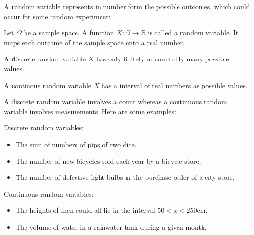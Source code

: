\documentclass[twoside,11pt,a4paper]{article}
\newif\ifEN \ENtrue	                %
\def\tr|#1|#2|{\ifEN #2\else #1\fi}     %
\newenvironment{ttile}[1]{\begin{tcolorbox}[colback=tile,sharp corners,title=#1]}{\end{tcolorbox}}
\def\vsp{\vspace{5mm}}
\theoremstyle{definition}
\begin{document}
\tr|Eine \textbf{Zufallsvariable} bildet die Ergebnisse eines Zufallsexperiments auf eine Zahl ab:
   |A \textbf{random variable} represents in number form the possible outcomes, which could occur for some random experiment:|
\vsp

\begin{ttile}{\tr|Zufallsvariable|Random variable|}
  \tr|Sei $\Omega$ eine Ergebnismenge. Eine Funktion $X: \Omega \to \mathbb{R}$ heisst eine
      \textbf{Zufallsvariable}. Sie bildet jedes Ergebnis auf eine auf eine reelle Zahl ab. 
     |Let $\Omega$ be a sample space. A function $X: \Omega \to \mathbb{R}$ is called a \textbf{random variable}. It maps each outcome of the sample space onto a real number.|
  \vsp

  \tr|Eine \textbf{diskrete} Zufallsvariable $X$ hat nur endlich oder abzählbar viele mögliche Werte.
     |A \textbf{discrete} random variable $X$ has only finitely or countably many  possible values.|
  \vsp

  \tr|Eine \textbf{stetige} Zufallsvariable $X$ hat als mögliche Werte ein Interval von reellen Zahlen.  
     |A \textbf{continous} random variable $X$ has a interval of real numbers as possible values. |
\end{ttile}
\vsp

\begin{example}
  \tr|Eine diskrete Zufallsvariable zählt meist etwas, wohingegen eine stetige Zufallsvariable etwas misst. Hier sind einige Beispiele: 
     |A discrete random variable involves a count whereas a continuous random variable involves measurements. Here are some examples:|
\vsp

\tr|Diskrete Zufalsvariabeln: |Discrete random variables:|
\begin{itemize}
\item \tr|Die Summe der Augen bei zwei Würfeln.|The sum of numbers of pips of two dice. |
\item
  \tr|Die Anzahl Fahrräder die in einem Laden jedes Jahr verkauft werden.
     |The number of new bicycles sold each year by a bicycle store.|
   \item
     \tr|Die Anzahl defekter Glühbirnen, in einer Sammelbestelllung.
        |The number of defective light bulbs in the purchase order of a city store.|
\end{itemize}

\tr|Stetige Zufallsvariabeln:| Continuous random variables:|
\begin{itemize}
\item
  \tr|Die Körpergrössen, einer Gruppe von Personen liegen  alle im Bereich $50<x<250$cm.
     |The heights of men could all lie in the interval $50<x<250$cm.|
   \item
     \tr|Das Wasservolumen in einem Regenwassertank in einem bestimmten Monat.
     |The volume of water in a rainwater tank during a given month.|
\end{itemize}

\end{example}
\end{document}
